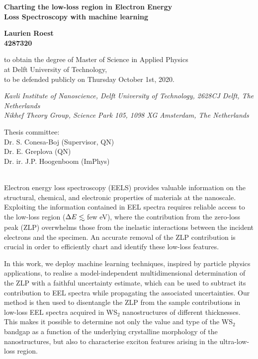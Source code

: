 \documentclass[12pt,a4paper]{article}
\def\lsim{\mathrel{\rlap{\lower4pt\hbox{\hskip1pt$\sim$}}
    \raise1pt\hbox{$<$}}}
\numberwithin{equation}{section}
\numberwithin{figure}{section}
\numberwithin{table}{section}
\begin{document}
\begin{center}
  {\Large \bf Charting the low-loss region in Electron Energy \\[0.3cm] Loss Spectroscopy with machine learning}
\vspace{1.4cm}

{\large \bf Laurien Roest \\[0.3cm]
4287320
}

\vspace{1.0cm}
 
{ to obtain the degree of Master of Science in Applied Physics \\[0.2cm]
at Delft University of Technology, \\[0.2cm]
to be defended publicly on Thursday October 1st, 2020.}

\vspace{5cm}

{\it \small Kavli Institute of Nanoscience, Delft University of Technology, 2628CJ Delft, The
  Netherlands\\[0.1cm]
Nikhef Theory Group, Science Park 105, 1098 XG Amsterdam, The
  Netherlands\\[0.1cm] }
  
\end{center}
\vspace{4cm}
Thesis committee: \\[0.1cm]
\indent Dr. S. Conesa-Boj (Supervisor, QN) \\[0.1cm]
\indent Dr. E. Greplova (QN) \\[0.1cm]
\indent Dr. ir. J.P. Hoogenboom (ImPhys)
\thispagestyle{empty}

\newpage

\\[1.0cm]
Electron energy loss spectroscopy (EELS) 
provides valuable information on the structural, chemical, 
and electronic properties of materials at the nanoscale.
%
Exploiting the information contained in EEL spectra requires
reliable access to the low-loss region ($\Delta E\lsim $ few eV),
where the contribution from the zero-loss peak (ZLP) overwhelms
those from the inelastic interactions between the incident
electrons and the specimen.
%
An accurate removal of the ZLP contribution is crucial 
in order to efficiently chart and identify these low-loss features.

In this work, we deploy machine learning techniques, inspired by particle physics applications,
to realise a model-independent multidimensional determination of the ZLP
with a faithful uncertainty estimate,
which can be used to subtract its contribution to EEL spectra while
propagating the associated uncertainties.
%
Our method is then used to disentangle the 
ZLP from the sample contributions in low-loss EEL spectra acquired
in WS$_2$ nanostructures of different thicknesses.
%
This makes it possible to determine not only the value and type of the WS$_2$ bandgap
as a function of the underlying crystalline morphology of the nanostructures,
but also to characterise exciton features arising in the ultra-low-loss region.
\end{document}
